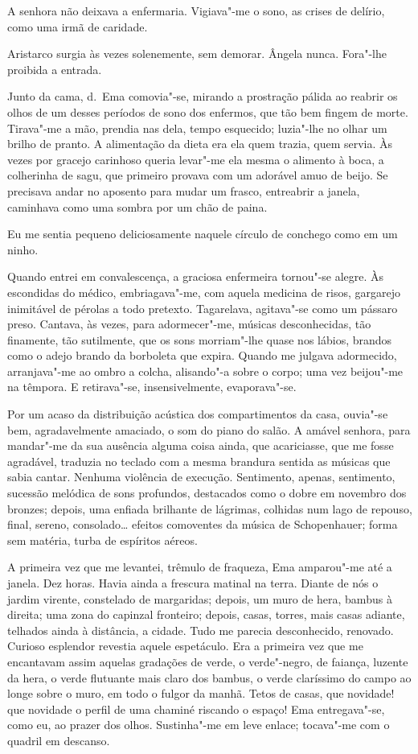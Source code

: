 A senhora não deixava a enfermaria. Vigiava"-me o sono,
as crises de delírio, como uma irmã de caridade. 

Aristarco surgia às
vezes solenemente, sem demorar. Ângela nunca. Fora"-lhe proibida a
entrada. 

Junto da cama, d.~Ema comovia"-se, mirando a prostração
pálida ao reabrir os olhos de um desses períodos de sono dos enfermos,
que tão bem fingem de morte. Tirava"-me a mão, prendia nas dela, tempo
esquecido; luzia"-lhe no olhar um brilho de pranto. A alimentação da
dieta era ela quem trazia, quem servia. Às vezes por gracejo carinhoso
queria levar"-me ela mesma o alimento à boca, a colherinha de sagu,
que primeiro provava com um adorável amuo de beijo. Se precisava andar
no aposento para mudar um frasco, entreabrir a janela, caminhava como
uma sombra por um chão de paina. 

Eu me sentia pequeno deliciosamente
naquele círculo de conchego como em um ninho. 

Quando entrei em
convalescença, a graciosa enfermeira tornou"-se alegre. Às escondidas
do médico, embriagava"-me, com aquela medicina de risos, gargarejo
inimitável de pérolas a todo pretexto. Tagarelava, agitava"-se como um
pássaro preso. Cantava, às vezes, para adormecer"-me, músicas
desconhecidas, tão finamente, tão sutilmente, que os sons morriam"-lhe
quase nos lábios, brandos como o adejo brando da borboleta que expira.
Quando me julgava adormecido, arranjava"-me ao ombro a colcha,
alisando"-a sobre o corpo; uma vez beijou"-me na têmpora. E
retirava"-se, insensivelmente, evaporava"-se.

Por um acaso da distribuição acústica dos compartimentos da casa,
ouvia"-se bem, agradavelmente amaciado, o som do piano do salão. A
amável senhora, para mandar"-me da sua ausência alguma coisa ainda,
que acariciasse, que me fosse agradável, traduzia no teclado com a
mesma brandura sentida as músicas que sabia cantar. Nenhuma violência
de execução. Sentimento, apenas, sentimento, sucessão melódica de sons
profundos, destacados como o dobre em novembro dos bronzes; depois, uma
enfiada brilhante de lágrimas, colhidas num lago de repouso, final,
sereno, consolado\ldots{} efeitos comoventes da música de Schopenhauer;
forma sem matéria, turba de espíritos aéreos. 

A primeira vez que me
levantei, trêmulo de fraqueza, Ema amparou"-me até a janela. Dez
horas. Havia ainda a frescura matinal na terra. Diante de nós o jardim
virente, constelado de margaridas; depois, um muro de hera, bambus à
direita; uma zona do capinzal fronteiro; depois, casas, torres, mais
casas adiante, telhados ainda à distância, a cidade. Tudo me parecia
desconhecido, renovado. Curioso esplendor revestia aquele espetáculo.
Era a primeira vez que me encantavam assim aquelas gradações de verde,
o verde"-negro, de faiança, luzente da hera, o verde flutuante mais
claro dos bambus, o verde claríssimo do campo ao longe sobre o muro, em
todo o fulgor da manhã. Tetos de casas, que novidade! que novidade o
perfil de uma chaminé riscando o espaço! Ema entregava"-se, como eu,
ao prazer dos olhos. Sustinha"-me em leve enlace; tocava"-me com o
quadril em descanso. 

